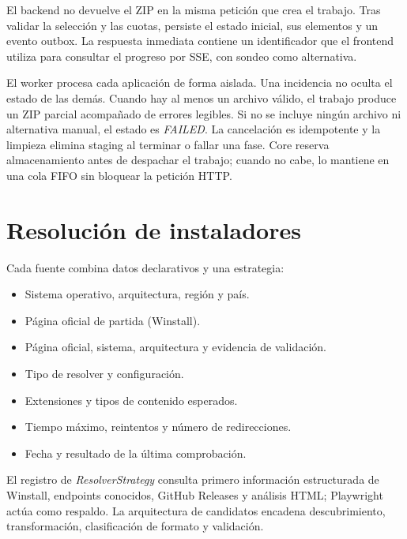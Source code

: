 
El backend no devuelve el ZIP en la misma petición que crea el trabajo. Tras validar la selección y las cuotas, persiste el estado inicial, sus elementos y un evento outbox. La respuesta inmediata contiene un identificador que el frontend utiliza para consultar el progreso por SSE, con sondeo como alternativa.

El worker procesa cada aplicación de forma aislada. Una incidencia no oculta el estado de las demás. Cuando hay al menos un archivo válido, el trabajo produce un ZIP parcial acompañado de errores legibles. Si no se incluye ningún archivo ni alternativa manual, el estado es \emph{FAILED}. La cancelación es idempotente y la limpieza elimina staging al terminar o fallar una fase. Core reserva almacenamiento antes de despachar el trabajo; cuando no cabe, lo mantiene en una cola FIFO sin bloquear la petición HTTP.


\section{Resolución de instaladores}

Cada fuente combina datos declarativos y una estrategia:

\begin{itemize}
	\item Sistema operativo, arquitectura, región y país.
	\item Página oficial de partida (Winstall).
	\item Página oficial, sistema, arquitectura y evidencia de validación.
	\item Tipo de resolver y configuración.
	\item Extensiones y tipos de contenido esperados.
	\item Tiempo máximo, reintentos y número de redirecciones.
	\item Fecha y resultado de la última comprobación.
\end{itemize}

El registro de \emph{ResolverStrategy} consulta primero información estructurada de Winstall, endpoints conocidos, GitHub Releases y análisis HTML; Playwright actúa como respaldo. La arquitectura de candidatos encadena descubrimiento, transformación, clasificación de formato y validación.

